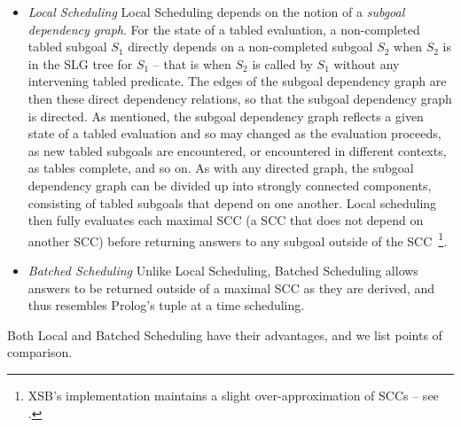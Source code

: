 \begin{itemize}

\item {\em Local Scheduling} Local Scheduling depends on the notion of
  a {\em subgoal dependency graph}.  For the state of a tabled
  evaluation, a non-completed tabled subgoal $S_1$ directly depends on
  a non-completed subgoal $S_2$ when $S_2$ is in the SLG tree for
  $S_1$ -- that is when $S_2$ is called by $S_1$ without any
  intervening tabled predicate.  The edges of the subgoal dependency
  graph are then these direct dependency relations, so that the
  subgoal dependency graph is directed.  As mentioned, the subgoal
  dependency graph reflects a given state of a tabled evaluation and
  so may changed as the evaluation proceeds, as new tabled subgoals
  are encountered, or encountered in different contexts, as tables
  complete, and so on.  As with any directed graph, the subgoal
  dependency graph can be divided up into strongly connected
  components, consisting of tabled subgoals that depend on one
  another.  Local scheduling then fully evaluates each maximal SCC (a
  SCC that does not depend on another SCC) before returning answers to
  any subgoal outside of the SCC~\footnote{XSB's implementation
    maintains a slight over-approximation of SCCs -- see
    \cite{JFLP-Scheduling}.}.

\item {\em Batched Scheduling} Unlike Local Scheduling, Batched
  Scheduling allows answers to be returned outside of a maximal SCC as
  they are derived, and thus resembles Prolog's tuple at a time
  scheduling.  
\end{itemize}

Both Local and Batched Scheduling have their advantages, and we list
points of comparison.

